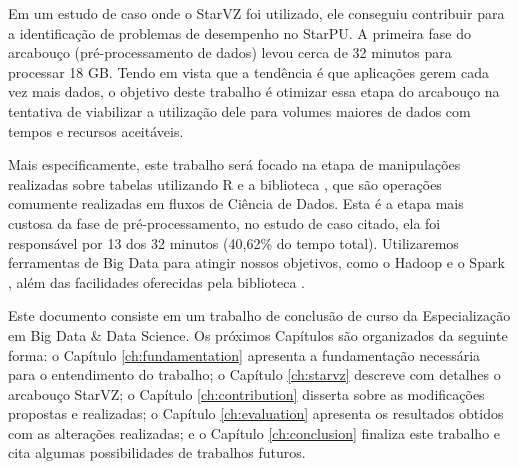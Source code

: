 Em um estudo de caso onde o StarVZ foi utilizado, ele conseguiu contribuir para 
a identificação de problemas de desempenho no StarPU. A primeira fase do 
arcabouço (pré-processamento de dados) levou cerca de 32 minutos para processar 
18 GB. Tendo em vista que a tendência é que aplicações gerem cada vez mais 
dados, o objetivo deste trabalho é otimizar essa etapa do arcabouço na tentativa 
de viabilizar a utilização dele para volumes maiores de dados com tempos e 
recursos aceitáveis.

Mais especificamente, este trabalho será focado na etapa de manipulações 
realizadas sobre tabelas utilizando R e a biblioteca , 
que são operações comumente realizadas em fluxos de Ciência de Dados. Esta 
é a etapa mais custosa da fase de pré-processamento, no estudo de caso citado, 
ela foi responsável por 13 dos 32 minutos (40,62\% do tempo total). 
Utilizaremos ferramentas de Big Data para atingir nossos objetivos, como o 
Hadoop \cite{ref:hadoopbook} e o Spark \cite{ref:sparkbook}, além das 
facilidades oferecidas pela biblioteca . 

Este documento consiste em um trabalho de conclusão de curso da Especialização 
em Big Data \& Data Science. Os próximos Capítulos são organizados da seguinte 
forma: o Capítulo \ref{ch:fundamentation} apresenta a fundamentação necessária 
para o entendimento do trabalho; o Capítulo \ref{ch:starvz} descreve com 
detalhes o arcabouço StarVZ; o Capítulo \ref{ch:contribution} disserta sobre as 
modificações propostas e realizadas; o Capítulo \ref{ch:evaluation} apresenta 
os resultados obtidos com as alterações realizadas; e o Capítulo 
\ref{ch:conclusion} finaliza este trabalho e cita algumas possibilidades de 
trabalhos futuros.
